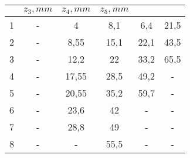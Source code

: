 \begin{tabular}{| c | c | c | c | c | c |}
    \hline
          & $z_3, mm$ & $z_4, mm$  & $z_5, mm$\\
    \hline
        1 & - & 4 & 8,1 & 6,4 & 21,5\\
    \hline
        2 & - & 8,55 & 15,1 & 22,1 & 43,5\\
    \hline
        3 & - & 12,2 & 22 & 33,2 & 65,5\\
    \hline
        4 & - & 17,55 & 28,5 & 49,2 & -\\
    \hline
        5 & - & 20,55 & 35,2 & 59,7 & -\\
    \hline
        6 & - & 23,6 & 42 & - & -\\
    \hline
        7 & - & 28,8 & 49 & - & -\\
    \hline
        8 & - & - & 55,5 & - & -\\
  \hline
  \end{tabular}
